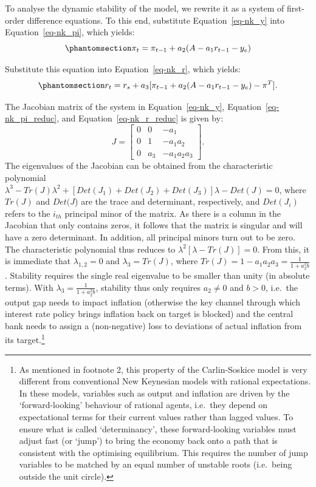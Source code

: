 \documentclass[
  letterpaper,
  DIV=11,
  numbers=noendperiod]{scrreprt}
\begin{document}
To analyse the dynamic stability of the model, we rewrite it as a system
of first-order difference equations. To this end, substitute
Equation~\ref{eq-nk_y} into Equation~\ref{eq-nk_pi}, which yields:
\begin{equation}\phantomsection\label{eq-nk_pi_reduc}{
\pi_t = \pi_{t-1} + a_2(A - a_1r_{t-1}-y_e)
}\end{equation}

Substitute this equation into Equation~\ref{eq-nk_r}, which yields:
\begin{equation}\phantomsection\label{eq-nk_r_reduc}{
r_t= r_{s} + a_3[\pi_{t-1} + a_2(A - a_1r_{t-1}-y_e) - \pi^T].
}\end{equation}

The Jacobian matrix of the system in Equation~\ref{eq-nk_y},
Equation~\ref{eq-nk_pi_reduc}, and Equation~\ref{eq-nk_r_reduc} is given
by: \[
J=\begin{bmatrix} 0& 0 &-a_1 \\0 & 1 & -a_1 a_2 \\ 0 & a_3 & -a_1 a_2 a_3 \end{bmatrix}.
\] The eigenvalues of the Jacobian can be obtained from the
characteristic polynomial
\(\lambda^3 - Tr(J)\lambda^2 + [Det(J_1) + Det(J_2) + Det(J_3)]\lambda - Det(J) = 0\),
where \(Tr(J)\) and \(Det(J\)) are the trace and determinant,
respectively, and \(Det(J_i)\) refers to the \(i_{th}\) principal minor
of the matrix. As there is a column in the Jacobian that only contains
zeros, it follows that the matrix is singular and will have a zero
determinant. In addition, all principal minors turn out to be zero. The
characteristic polynomial thus reduces to
\(\lambda^2[\lambda - Tr(J)]=0\). From this, it is immediate that
\(\lambda_{1,2}=0\) and \(\lambda_{3}=Tr(J)\), where
\(Tr(J)=1-a_1a_2a_3=\frac{1}{1+a_2^2b}\). Stability requires the single
real eigenvalue to be smaller than unity (in absolute terms). With
\(\lambda_3=\frac{1}{1+a_2^2b}\), stability thus only requires
\(a_2 \neq 0\) and \(b>0\), i.e.~the output gap needs to impact
inflation (otherwise the key channel through which interest rate policy
brings inflation back on target is blocked) and the central bank needs
to assign a (non-negative) loss to deviations of actual inflation from
its target.\footnote{As mentioned in footnote 2, this property of the
  Carlin-Soskice model is very different from conventional New Keynesian
  models with rational expectations. In these models, variables such as
  output and inflation are driven by the `forward-looking' behaviour of
  rational agents, i.e.~they depend on expectational terms for their
  current values rather than lagged values. To ensure what is called
  `determinancy', these forward-looking variables must adjust fast (or
  `jump') to bring the economy back onto a path that is consistent with
  the optimising equilibrium. This requires the number of jump variables
  to be matched by an equal number of unstable roots (i.e.~being outside
  the unit circle).}
\end{document}
